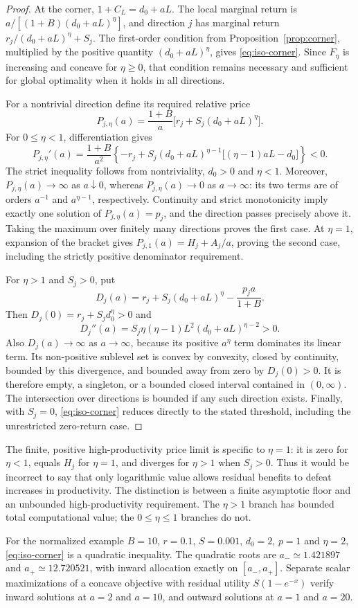\begin{proof}
At the corner, $1+C_L=d_0+aL$. The local marginal return is
$a/[(1+B)(d_0+aL)^\eta]$, and direction $j$ has marginal return
$r_j/(d_0+aL)^\eta+S_j$. The first-order condition from
Proposition~\ref{prop:corner}, multiplied by the positive quantity
$(d_0+aL)^\eta$, gives \eqref{eq:iso-corner}. Since $F_\eta$ is
increasing and concave for $\eta\geq0$, that condition remains necessary
and sufficient for global optimality when it holds in all directions.

For a nontrivial direction define its required relative price
\[
 P_{j,\eta}(a)=\frac{1+B}{a}\big[r_j+S_j(d_0+aL)^\eta\big].
\]
For $0\leq\eta<1$, differentiation gives
\[
 P_{j,\eta}'(a)=\frac{1+B}{a^2}
 \left\{-r_j+S_j(d_0+aL)^{\eta-1}
 \big[(\eta-1)aL-d_0\big]\right\}<0.
\]
The strict inequality follows from nontriviality, $d_0>0$ and
$\eta<1$. Moreover, $P_{j,\eta}(a)\to\infty$ as $a\downarrow0$,
whereas $P_{j,\eta}(a)\to0$ as $a\to\infty$: its two terms are of
orders $a^{-1}$ and $a^{\eta-1}$, respectively. Continuity and strict
monotonicity imply exactly one solution of $P_{j,\eta}(a)=p_j$,
and the direction passes precisely above it. Taking the maximum over
finitely many directions proves the first case. At $\eta=1$, expansion
of the bracket gives $P_{j,1}(a)=H_j+A_j/a$, proving the second case,
including the strictly positive denominator requirement.

For $\eta>1$ and $S_j>0$, put
\[
 D_j(a)=r_j+S_j(d_0+aL)^\eta-\frac{p_j a}{1+B}.
\]
Then $D_j(0)=r_j+S_jd_0^\eta>0$ and
\[
 D_j''(a)=S_j\eta(\eta-1)L^2(d_0+aL)^{\eta-2}>0.
\]
Also $D_j(a)\to\infty$ as $a\to\infty$, because its positive
$a^\eta$ term dominates its linear term. Its non-positive sublevel set
is convex by convexity, closed by continuity, bounded by this divergence,
and bounded away from zero by $D_j(0)>0$. It is therefore empty, a
singleton, or a bounded closed interval contained in $(0,\infty)$.
The intersection over directions is bounded if any such direction exists.
Finally, with $S_j=0$, \eqref{eq:iso-corner} reduces directly to the
stated threshold, including the unrestricted zero-return case.
\end{proof}
The finite, positive high-productivity price limit is specific to
$\eta=1$: it is zero for $\eta<1$, equals $H_j$ for $\eta=1$, and
diverges for $\eta>1$ when $S_j>0$. Thus it would be incorrect to say
that only logarithmic value allows residual benefits to defeat increases
in productivity. The distinction is between a finite asymptotic floor and
an unbounded high-productivity requirement. The $\eta>1$ branch has
bounded total computational value; the $0\leq\eta\leq1$ branches do not.

For the normalized example $B=10$, $r=0.1$, $S=0.001$, $d_0=2$,
$p=1$ and $\eta=2$, \eqref{eq:iso-corner} is a quadratic inequality.
The quadratic roots are $a_-\simeq1.421897$ and $a_+\simeq12.720521$, with inward
allocation exactly on $[a_-,a_+]$. Separate scalar maximizations of a
concave objective with residual utility $S(1-e^{-x})$ verify inward
solutions at $a=2$ and $a=10$, and outward solutions at $a=1$ and $a=20$.
